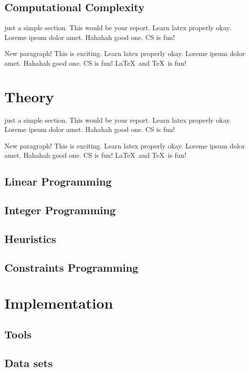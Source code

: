 \documentclass[a4paper, 12pt]{report}
\begin{document}
\section{Computational Complexity}

just a simple section. This would be your report. Learn latex properly okay. Loreme ipsum dolor amet. Hahahah good one. CS is fun!

New paragraph! This is exciting. Learn latex properly okay. Loreme ipsum dolor amet. Hahahah good one. CS is fun! \LaTeX\ and \TeX\ is fun!

\chapter{Theory}
just a simple section. This would be your report. Learn latex properly okay. Loreme ipsum dolor amet. Hahahah good one. CS is fun!

New paragraph! This is exciting. Learn latex properly okay. Loreme ipsum dolor amet. Hahahah good one. CS is fun! \LaTeX\ and \TeX\ is fun!
\section{Linear Programming}

\section{Integer Programming}

\section{Heuristics}

\section{Constraints Programming}


\chapter{Implementation}

\section{Tools}

\section{Data sets}
\end{document}
